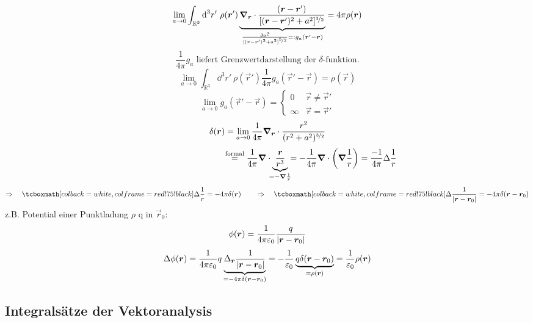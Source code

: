 $$\lim_{a \to 0} \int_{\mathbb{R}^3} \textrm{d}^3r'\ \rho(\bm{r}')\underbrace{\bm{\nabla}_{\bm{r}} \cdot \frac{(\bm{r} - \bm{r}')}{[(\bm{r} - \bm{r}')^2 + a^2]^{\nicefrac{3}{2}}}}_{\frac{3 a^2}{[(\bm{r} - \bm{r}')^2 + a^2]^{\nicefrac{5}{2}}} =: g_a(\bm{r}' - \bm{r})} = 4 \pi \rho(\bm{r})$$
%
%
%
%
%
%
$$\frac{1}{4 \pi} g_a \textrm{ liefert Grenzwertdarstellung der $\delta$-funktion.}$$
$$\lim_{a\to 0} \int_{\mathbb{R}^3} \dd^3r'\ \rho(\vec{r}') \frac{1}{4\pi}g_a(\vec{r}'-\vec{r})=\rho(\vec{r})$$
$$\lim_{a \to 0} g_a(\vec{r}' - \vec{r}) = \left\{ \begin{array}{cc}
0 		& \vec{r} \neq  \vec{r}'\\
\infty 	& \vec{r} = 	\vec{r}'
\end{array} \right.$$
$$\delta(\bm{r}) = \lim_{a \to 0} \frac{1}{4 \pi} \bm{\nabla}_{\bm{r}} \cdot \frac{r^2}{(r^2+a^2)^{\nicefrac{3}{2}}}$$
$$\hspace{3.6cm} \overset{\textrm{formal}}{=} \frac{1}{4 \pi} \vabla \cdot \underbrace{\frac{\vec{r}}{r^3}}_{\mathclap{= - \vabla \frac{1}{r}}} = - \frac{1}{4 \pi} \vabla \cdot \bigg(\vabla \frac{1}{r}\bigg) = \frac{-1}{4 \pi} \Delta \frac{1}{r}$$ $$\Rightarrow \quad \rmbox{\Delta \frac{1}{r} = -4 \pi \delta(\vec{r})} \qquad 
\Rightarrow \quad \rmbox{\Delta \frac{1}{|\vec{r} - \vec{r}_0|} = - 4 \pi \delta(\vec{r} - \vec{r}_0)}$$
z.B. Potential einer Punktladung $\rho$ q in $\vec{r}_0$:
$$\phi(\bm{r}) = \frac{1}{4\pi\varepsilon_0} \frac{q}{|\bm{r} - \bm{r}_0|}$$
$$\Delta \phi(\bm{r}) = \frac{1}{4\pi\varepsilon_0} q \underbrace{\Delta_{\bm{r}} \frac{1}{|\bm{r} - \bm{r}_0|} }_{= - 4 \pi \delta(\bm{r} - \bm{r}_0)} = - \frac{1}{\varepsilon_0} \underbrace{q \delta(\bm{r} - \bm{r}_0)}_{= \rho(\bm{r})} = \frac{1}{\varepsilon_0} \rho(\bm{r})$$



\subsection{Integralsätze der Vektoranalysis}

